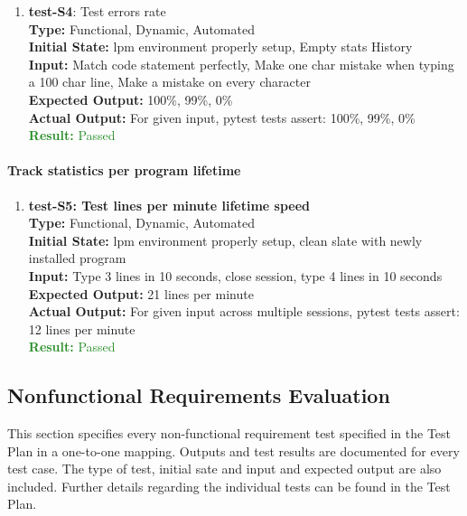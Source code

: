 \documentclass[12pt, titlepage]{article}
\begin{document}
\begin{enumerate}
    \item{\textbf{test-S4}: Test errors rate\\}
    \textbf{Type:} Functional, Dynamic, Automated \\
    \textbf{Initial State:} lpm environment properly setup, Empty stats History\\
    \textbf{Input:} Match code statement perfectly, Make one char mistake when typing a 100 char line, Make a mistake on every character\\
    \textbf{Expected Output:} 100\%, 99\%, 0\%\\
    \textbf{Actual Output:} For given input, pytest tests assert: 100\%, 99\%, 0\% \\
    \textcolor{ForestGreen}{\textbf{Result:} Passed}
\end{enumerate}

\paragraph{Track statistics per program lifetime}
\begin{enumerate}
    \item{\textbf{test-S5: Test lines per minute lifetime speed\\}}
    \textbf{Type:} Functional, Dynamic, Automated\\
    \textbf{Initial State:} lpm environment properly setup, clean slate with newly installed program \\
    \textbf{Input:} Type 3 lines in 10 seconds, close session, type 4 lines in 10 seconds \\
    \textbf{Expected Output:} 21 lines per minute \\
    \textbf{Actual Output:} For given input across multiple sessions, pytest tests assert: 12 lines per minute \\
    \textcolor{ForestGreen}{\textbf{Result:} Passed}
\end{enumerate}

\subsection{Nonfunctional Requirements Evaluation}

This section specifies every non-functional requirement test specified in the Test Plan in a one-to-one mapping. Outputs and test results are documented for every test case. The type of test, initial sate and input and expected output are also included. Further details regarding the individual tests can be found in the Test Plan.\\
\end{document}
